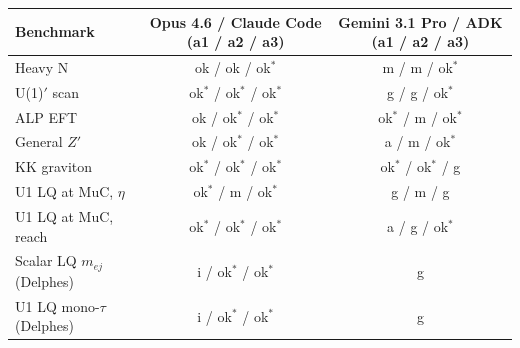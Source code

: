 \begin{tabular}{lcc}
\toprule
Benchmark & Opus 4.6 / Claude Code (a1 / a2 / a3) & Gemini 3.1 Pro / ADK (a1 / a2 / a3) \\
\midrule
Heavy N & ok / ok / ok$^{*}$ & m / m / ok$^{*}$ \\
U(1)$'$ scan & ok$^{*}$ / ok$^{*}$ / ok$^{*}$ & g / g / ok$^{*}$ \\
ALP EFT & ok / ok$^{*}$ / ok$^{*}$ & ok$^{*}$ / m / ok$^{*}$ \\
General $Z'$ & ok / ok$^{*}$ / ok$^{*}$ & a / m / ok$^{*}$ \\
KK graviton & ok$^{*}$ / ok$^{*}$ / ok$^{*}$ & ok$^{*}$ / ok$^{*}$ / g \\
U1 LQ at MuC, $\eta$ & ok$^{*}$ / m / ok$^{*}$ & g / m / g \\
U1 LQ at MuC, reach & ok$^{*}$ / ok$^{*}$ / ok$^{*}$ & a / g / ok$^{*}$ \\
Scalar LQ $m_{ej}$ (Delphes) & i / ok$^{*}$ / ok$^{*}$ & g \\
U1 LQ mono-$\tau$ (Delphes) & i / ok$^{*}$ / ok$^{*}$ & g \\
\bottomrule
\end{tabular}
